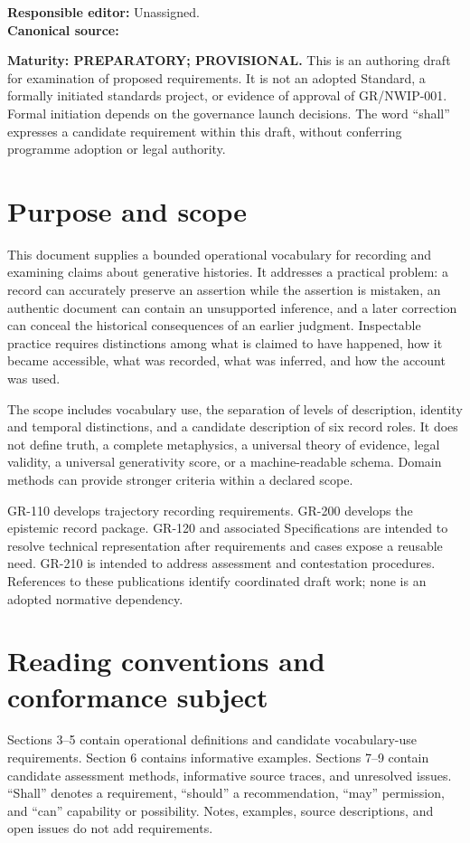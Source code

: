 \documentclass[11pt,a4paper]{article}
\begin{document}

\noindent\textbf{Responsible editor:} Unassigned.\\
\textbf{Canonical source:} 

\noindent\textbf{Maturity: PREPARATORY; PROVISIONAL.} This is an authoring draft for examination of proposed requirements. It is not an adopted Standard, a formally initiated standards project, or evidence of approval of GR/NWIP-001. Formal initiation depends on the governance launch decisions. The word ``shall'' expresses a candidate requirement within this draft, without conferring programme adoption or legal authority.

\tableofcontents\clearpage

\section{Purpose and scope}
This document supplies a bounded operational vocabulary for recording and examining claims about generative histories. It addresses a practical problem: a record can accurately preserve an assertion while the assertion is mistaken, an authentic document can contain an unsupported inference, and a later correction can conceal the historical consequences of an earlier judgment. Inspectable practice requires distinctions among what is claimed to have happened, how it became accessible, what was recorded, what was inferred, and how the account was used.

The scope includes vocabulary use, the separation of levels of description, identity and temporal distinctions, and a candidate description of six record roles. It does not define truth, a complete metaphysics, a universal theory of evidence, legal validity, a universal generativity score, or a machine-readable schema. Domain methods can provide stronger criteria within a declared scope.

GR-110 develops trajectory recording requirements. GR-200 develops the epistemic record package. GR-120 and associated Specifications are intended to resolve technical representation after requirements and cases expose a reusable need. GR-210 is intended to address assessment and contestation procedures. References to these publications identify coordinated draft work; none is an adopted normative dependency.

\section{Reading conventions and conformance subject}
Sections 3--5 contain operational definitions and candidate vocabulary-use requirements. Section 6 contains informative examples. Sections 7--9 contain candidate assessment methods, informative source traces, and unresolved issues. ``Shall'' denotes a requirement, ``should'' a recommendation, ``may'' permission, and ``can'' capability or possibility. Notes, examples, source descriptions, and open issues do not add requirements.
\end{document}
